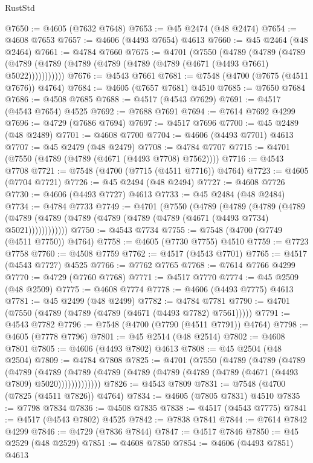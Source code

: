 \begin{lexlean}{RustStd}
\begin{coremodule}
@7650 := @4605 (@7632 @7648)
@7653 := @45 @2474 (@48 @2474)
@7654 := @4608 @7653
@7657 := @4606 (@4493 @7654) @4613
@7660 := @45 @2464 (@48 @2464)
@7661 := @4784 @7660
@7675 := @4701
    (@7550
      (@4789
        (@4789
          (@4789 (@4789 (@4789 (@4789 (@4789 (@4789 (@4789 (@4671 (@4493 @7661) @5022)))))))))))
@7676 := @4543 @7661
@7681 := @7548 (@4700 (@7675 (@4511 @7676)) @4764)
@7684 := @4605 (@7657 @7681) @4510
@7685 := @7650 @7684
@7686 := @4508 @7685
@7688 := @4517 (@4543 @7629)
@7691 := @4517 (@4543 @7654) @4525
@7692 := @7688 @7691
@7694 := @7614 @7692 @4299
@7696 := @4729 (@7686 @7694)
@7697 := @4517 @7696
@7700 := @45 @2489 (@48 @2489)
@7701 := @4608 @7700
@7704 := @4606 (@4493 @7701) @4613
@7707 := @45 @2479 (@48 @2479)
@7708 := @4784 @7707
@7715 := @4701 (@7550 (@4789 (@4789 (@4671 (@4493 @7708) @7562))))
@7716 := @4543 @7708
@7721 := @7548 (@4700 (@7715 (@4511 @7716)) @4764)
@7723 := @4605 (@7704 @7721)
@7726 := @45 @2494 (@48 @2494)
@7727 := @4608 @7726
@7730 := @4606 (@4493 @7727) @4613
@7733 := @45 @2484 (@48 @2484)
@7734 := @4784 @7733
@7749 := @4701
    (@7550
      (@4789
        (@4789
          (@4789
            (@4789 (@4789 (@4789 (@4789 (@4789 (@4789 (@4789 (@4671 (@4493 @7734) @5021))))))))))))
@7750 := @4543 @7734
@7755 := @7548 (@4700 (@7749 (@4511 @7750)) @4764)
@7758 := @4605 (@7730 @7755) @4510
@7759 := @7723 @7758
@7760 := @4508 @7759
@7762 := @4517 (@4543 @7701)
@7765 := @4517 (@4543 @7727) @4525
@7766 := @7762 @7765
@7768 := @7614 @7766 @4299
@7770 := @4729 (@7760 @7768)
@7771 := @4517 @7770
@7774 := @45 @2509 (@48 @2509)
@7775 := @4608 @7774
@7778 := @4606 (@4493 @7775) @4613
@7781 := @45 @2499 (@48 @2499)
@7782 := @4784 @7781
@7790 := @4701 (@7550 (@4789 (@4789 (@4789 (@4671 (@4493 @7782) @7561)))))
@7791 := @4543 @7782
@7796 := @7548 (@4700 (@7790 (@4511 @7791)) @4764)
@7798 := @4605 (@7778 @7796)
@7801 := @45 @2514 (@48 @2514)
@7802 := @4608 @7801
@7805 := @4606 (@4493 @7802) @4613
@7808 := @45 @2504 (@48 @2504)
@7809 := @4784 @7808
@7825 := @4701
    (@7550
      (@4789
        (@4789
          (@4789
            (@4789
              (@4789
                (@4789 (@4789 (@4789 (@4789 (@4789 (@4789 (@4671 (@4493 @7809) @5020)))))))))))))
@7826 := @4543 @7809
@7831 := @7548 (@4700 (@7825 (@4511 @7826)) @4764)
@7834 := @4605 (@7805 @7831) @4510
@7835 := @7798 @7834
@7836 := @4508 @7835
@7838 := @4517 (@4543 @7775)
@7841 := @4517 (@4543 @7802) @4525
@7842 := @7838 @7841
@7844 := @7614 @7842 @4299
@7846 := @4729 (@7836 @7844)
@7847 := @4517 @7846
@7850 := @45 @2529 (@48 @2529)
@7851 := @4608 @7850
@7854 := @4606 (@4493 @7851) @4613

\end{coremodule}
\end{lexlean}
